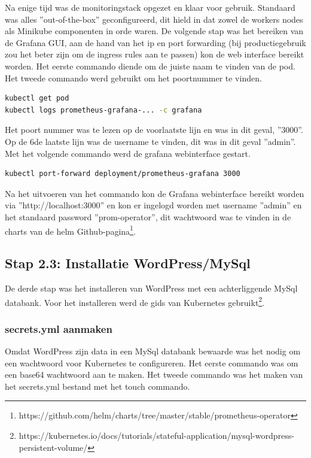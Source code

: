 Na enige tijd was de monitoringstack opgezet en klaar voor gebruik. Standaard was alles ''out-of-the-box'' geconfigureerd, dit hield in dat zowel de workers nodes als Minikube componenten in orde waren. De volgende stap was het bereiken van de Grafana GUI, aan de hand van het ip en port forwarding (bij productiegebruik zou het beter zijn om de ingress rules aan te passen) kon de web interface bereikt worden. Het eerste commando diende om de juiste naam te vinden van de pod. Het tweede commando werd gebruikt om het poortnummer te vinden.

\begin{lstlisting}[language=bash,caption={prometheus-grafana naam/poort}]
kubectl get pod
kubectl logs prometheus-grafana-... -c grafana  
\end{lstlisting}

Het poort nummer was te lezen op de voorlaatste lijn en was in dit geval, ''3000''. Op de 6de laatste lijn was de username te vinden, dit was in dit geval ''admin''. Met het volgende commando werd de grafana webinterface gestart. 

\begin{lstlisting}[language=bash,caption={port forward}]
kubectl port-forward deployment/prometheus-grafana 3000
\end{lstlisting}

Na het uitvoeren van het commando kon de Grafana webinterface bereikt worden via ''http://localhost:3000'' en kon er ingelogd worden met username ''admin'' en het standaard password ''prom-operator'', dit wachtwoord was te vinden in de charts van de helm Github-pagina\footnote{https://github.com/helm/charts/tree/master/stable/prometheus-operator}.

\subsection{Stap 2.3: Installatie WordPress/MySql}

De derde stap was het installeren van WordPress met een achterliggende MySql databank. Voor het installeren werd de gids van Kubernetes gebruikt\footnote{https://kubernetes.io/docs/tutorials/stateful-application/mysql-wordpress-persistent-volume/}.

\subsubsection{secrets.yml aanmaken}

Omdat WordPress zijn data in een MySql databank bewaarde was het nodig om een wachtwoord voor Kubernetes te configureren. Het eerste commando was om een base64 wachtwoord aan te maken. Het tweede commando was het maken van het secrets.yml bestand met het touch commando.


